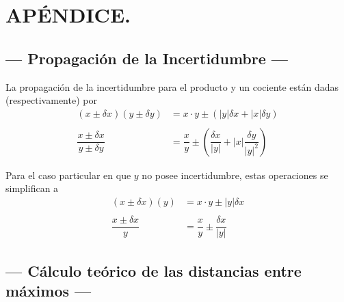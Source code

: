 \documentclass[12pt,a4paper]{article}
\begin{document}



\section{APÉNDICE.} %

\subsection{--- Propagación de la Incertidumbre ---}
	
	La propagación de la incertidumbre para el producto y un cociente están dadas (respectivamente) por
	\begin{align*}
		(x\pm\delta x)(y\pm\delta y)&=x\cdot y\pm\left(|y|\delta x+|x|\delta y \right)\\\\
		\dfrac{x\pm\delta x}{y\pm\delta y}&=\dfrac{x}{y}\pm\left(\dfrac{\delta x}{|y|}+|x|\dfrac{\delta y}{|y|^2}\right)
	\end{align*}
	
	Para el caso particular en que $ y $ no posee incertidumbre, estas operaciones se simplifican a
	\begin{align*}
		(x\pm\delta x)(y)&=x\cdot y\pm|y|\delta x\\\\
		\dfrac{x\pm\delta x}{y}&=\dfrac{x}{y}\pm\dfrac{\delta x}{|y|}
	\end{align*} 

	\subsection{--- Cálculo teórico de las distancias entre máximos ---}	
	
\end{document}
